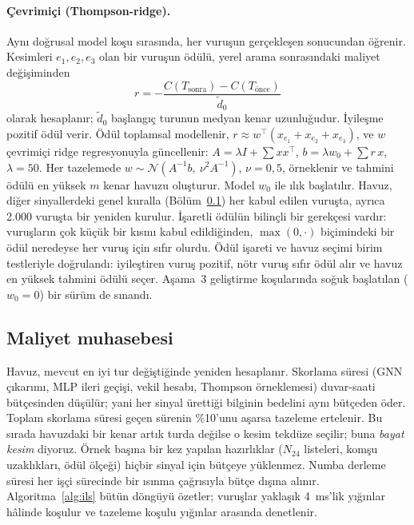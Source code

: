 \paragraph{Çevrimiçi (Thompson-ridge).} Aynı doğrusal model koşu sırasında, her vuruşun gerçekleşen
sonucundan öğrenir. Kesimleri $e_1,e_2,e_3$ olan bir vuruşun ödülü, yerel arama sonrasındaki
maliyet değişiminden
\begin{equation}
  r=-\frac{C(T_{\text{sonra}})-C(T_{\text{önce}})}{\tilde d_0}
  \label{eq:reward}
\end{equation}
olarak hesaplanır; $\tilde d_0$ başlangıç turunun medyan kenar uzunluğudur. İyileşme pozitif ödül
verir. Ödül toplamsal modellenir, $r\approx w^\top(x_{e_1}+x_{e_2}+x_{e_3})$, ve $w$ çevrimiçi
ridge regresyonuyla güncellenir: $A=\lambda I+\sum xx^\top$, $b=\lambda w_0+\sum r\,x$,
$\lambda=50$. Her tazelemede $w\sim\mathcal N(A^{-1}b,\ \nu^2A^{-1})$, $\nu=0{,}5$, örneklenir ve
tahmini ödülü en yüksek $m$ kenar havuzu oluşturur. Model $w_0$ ile ılık başlatılır. Havuz, diğer sinyallerdeki genel kuralla
(Bölüm~\ref{sec:yontem-maliyet}) her kabul edilen vuruşta, ayrıca 2.000 vuruşta bir yeniden kurulur. İşaretli ödülün bilinçli bir gerekçesi
vardır: vuruşların çok küçük bir kısmı kabul edildiğinden, $\max(0,\cdot)$ biçimindeki bir ödül
neredeyse her vuruş için sıfır olurdu. Ödül işareti ve havuz seçimi birim testleriyle doğrulandı:
iyileştiren vuruş pozitif, nötr vuruş sıfır ödül alır ve havuz en yüksek tahmini ödülü seçer.
Aşama~3 geliştirme koşularında soğuk başlatılan ($w_0=0$) bir sürüm de sınandı.

\subsection{Maliyet muhasebesi}\label{sec:yontem-maliyet}

Havuz, mevcut en iyi tur değiştiğinde yeniden hesaplanır. Skorlama süresi (GNN çıkarımı, MLP ileri
geçişi, vekil hesabı, Thompson örneklemesi) duvar-saati bütçesinden düşülür; yani her sinyal
ürettiği bilginin bedelini aynı bütçeden öder. Toplam skorlama süresi geçen sürenin \%10'unu
aşarsa tazeleme ertelenir. Bu sırada havuzdaki bir kenar artık turda değilse o kesim tekdüze
seçilir; buna \emph{bayat kesim} diyoruz. Örnek başına bir kez yapılan hazırlıklar ($N_{24}$
listeleri, komşu uzaklıkları, ödül ölçeği) hiçbir sinyal için bütçeye yüklenmez. Numba derleme
süresi her işçi sürecinde bir ısınma çağrısıyla bütçe dışına alınır. Algoritma~\ref{alg:ils}
bütün döngüyü özetler; vuruşlar yaklaşık 4~ms'lik yığınlar hâlinde koşulur ve tazeleme koşulu
yığınlar arasında denetlenir.

